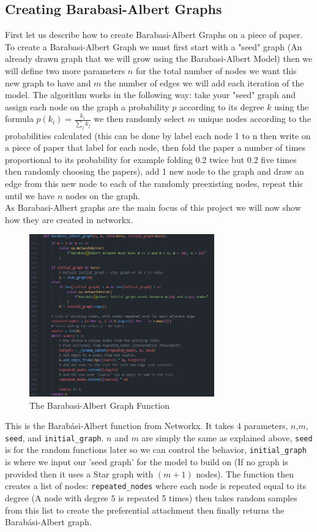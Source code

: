 \documentclass{article}
\begin{document}
        \subsection{Creating Barabasi-Albert Graphs}
        First let us describe how to create Barabasi-Albert Graphs on a piece of paper. To create a Barabasi-Albert Graph we must first start with a "seed" graph (An already drawn graph that we will grow using the Barabasi-Albert Model) then we will define two more parameters $n$ for the total number of nodes we want this new graph to have and $m$ the number of edges we will add each iteration of the model. The algorithm works in the following way: take your "seed" graph and assign each node on the graph a probability $p$ according to its degree $k$ using the formula $p(k_{i}) = \frac{k_{i}}{\sum_{j} {k_{j}}}$ we then randomly select $m$ unique nodes according to the probabilities calculated (this can be done by label each node 1 to n then write on a piece of paper that label for each node, then fold the paper a number of times proportional to its probability for example folding 0.2 twice but 0.2 five times then randomly choosing the papers), add 1 new node to the graph and draw an edge from this new node to each of the randomly preexisting nodes, repeat this until we have $n$ nodes on the graph.\\
        As Barabasi-Albert graphs are the main focus of this project we will now show how they are created in networkx. 
        \begin{figure}[H]
            \includegraphics[width=8cm]{images/BARABASI_FUNC.png}
            \caption{The Barabasi-Albert Graph Function}
            \label{fig:Barabasi-Albert function1}
        \end{figure}
        This is the Barabási-Albert function from Networkx. It takes 4 parameters, $n$,$m$, \verb|seed|, and \verb|initial_graph|. $n$ and $m$ are simply the same as explained above, \verb|seed| is for the random functions later so we can control the behavior,  \verb|initial_graph| is where we input our 'seed graph' for the model to build on (If no graph is provided then it uses a Star graph with $(m+1)$ nodes). The function then creates a list of nodes: \verb|repeated_nodes| where each node is repeated equal to its degree (A node with degree $5$ is repeated 5 times) then takes random samples from this list to create the preferential attachment then finally returns the Barabási-Albert graph. 
        
\end{document}

